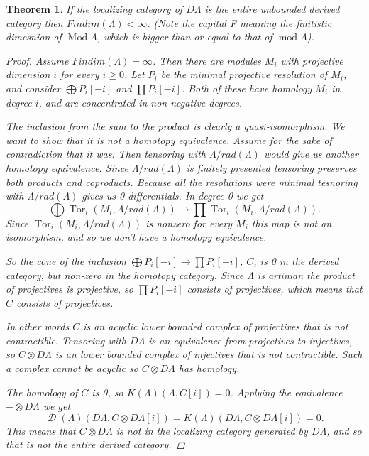\documentclass[11pt, a4paper, english]{article}
\newtheorem{theorem}{Theorem}[section]
\theoremstyle{definition}
\DeclareMathOperator{\Tor}{Tor}
\DeclareMathOperator{\Mod}{Mod}
\def\mod{\operatorname{mod}}
\DeclareMathOperator{\D}{\mathcal{D}}
\begin{document}
\begin{theorem}\cite[Theorem~4.3]{Rick19}
	If the localizing category of $D\Lambda$ is the entire unbounded derived category then $Findim(\Lambda) < \infty$. (Note the capital F meaning the finitistic dimesnion of $\Mod\Lambda$, which is bigger than or equal to that of $\mod\Lambda$).
	
	\begin{proof}
		Assume $Findim(\Lambda) = \infty$. Then there are modules $M_i$ with projective dimension $i$ for every $i \geq 0$. Let $P_i$ be the minimal projective resolution of $M_i$, and consider $\bigoplus P_i[-i]$ and $\prod P_i[-i]$. Both of these have homology $M_i$ in degree $i$, and are concentrated in non-negative degrees.
		
		The inclusion from the sum to the product is clearly a quasi-isomorphism. We want to show that it is not a homotopy equivalence. Assume for the sake of contradiction that it was. Then tensoring with $\Lambda/rad(\Lambda)$ would give us another homotopy equivalence. Since $\Lambda/rad(\Lambda)$ is finitely presented tensoring preserves both products and coproducts. Because all the resolutions were minimal tesnoring with $\Lambda/rad(\Lambda)$ gives us 0 differentials. In degree 0 we get $$\bigoplus \Tor_i(M_i, \Lambda/rad(\Lambda)) \to \prod \Tor_i(M_i, \Lambda/rad(\Lambda)) .$$
		Since $\Tor_i(M_i, \Lambda/rad(\Lambda))$ is nonzero for every $M_i$ this map is not an isomorphism, and so we don't have a homotopy equivalence.
		
		So the cone of the inclusion $\bigoplus P_i[-i] \to \prod P_i[-i]$, $C$, is 0 in the derived category, but non-zero in the homotopy category. Since $\Lambda$ is artinian the product of projectives is projective\cite[Theorem~3.3]{Chase60}, so $\prod P_i[-i]$ consists of projectives, which means that $C$ consists of projectives. 
		
		In other words $C$ is an acyclic lower bounded complex of projectives that is not contractible. Tensoring with $D\Lambda$ is an equivalence from projectives to injectives, so $C\otimes D\Lambda$ is an lower bounded complex of injectives that is not contractible. Such a complex cannot be acyclic so $C\otimes D\Lambda$ has homology.
		
		The homology of $C$ is 0, so $K(\Lambda)(\Lambda, C[i]) = 0$. Applying the equivalence $-\otimes D\Lambda$ we get $$\D(\Lambda)(D\Lambda, C\otimes D\Lambda [i])=K(\Lambda)(D\Lambda, C\otimes D\Lambda [i])=0.$$ This means that $C\otimes D\Lambda$ is not in the localizing category generated by $D\Lambda$, and so that is not the entire derived category.
	\end{proof}
\end{theorem}
\end{document}
